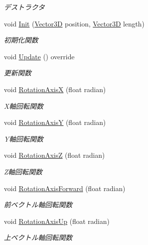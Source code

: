\begin{DoxyCompactItemize}
\begin{DoxyCompactList}\small\item\em デストラクタ \end{DoxyCompactList}\item 
void \mbox{\hyperlink{class_o_b_b_ae5d7ba6a226b2da4271ffd16d478d800}{Init}} (\mbox{\hyperlink{class_vector3_d}{Vector3D}} position, \mbox{\hyperlink{class_vector3_d}{Vector3D}} length)
\begin{DoxyCompactList}\small\item\em 初期化関数 \end{DoxyCompactList}\item 
void \mbox{\hyperlink{class_o_b_b_af9b3e9a2d810f5b37cf849a3804d7bc7}{Update}} () override
\begin{DoxyCompactList}\small\item\em 更新関数 \end{DoxyCompactList}\item 
void \mbox{\hyperlink{class_o_b_b_a5e298111d87b16034c6d0f3753ee8eb9}{Rotation\+AxisX}} (float radian)
\begin{DoxyCompactList}\small\item\em X軸回転関数 \end{DoxyCompactList}\item 
void \mbox{\hyperlink{class_o_b_b_a8add6096a19079f1eb89d881d5dd355b}{Rotation\+AxisY}} (float radian)
\begin{DoxyCompactList}\small\item\em Y軸回転関数 \end{DoxyCompactList}\item 
void \mbox{\hyperlink{class_o_b_b_a364e56977bd0bd6a9f1e62ea700dfc09}{Rotation\+AxisZ}} (float radian)
\begin{DoxyCompactList}\small\item\em Z軸回転関数 \end{DoxyCompactList}\item 
void \mbox{\hyperlink{class_o_b_b_ae89c47a2d25ac3637cd8cc85fcb69413}{Rotation\+Axis\+Forward}} (float radian)
\begin{DoxyCompactList}\small\item\em 前ベクトル軸回転関数 \end{DoxyCompactList}\item 
void \mbox{\hyperlink{class_o_b_b_ab0919b09423e3761a5a804a12d71580d}{Rotation\+Axis\+Up}} (float radian)
\begin{DoxyCompactList}\small\item\em 上ベクトル軸回転関数 \end{DoxyCompactList}\item 

\end{DoxyCompactItemize}
